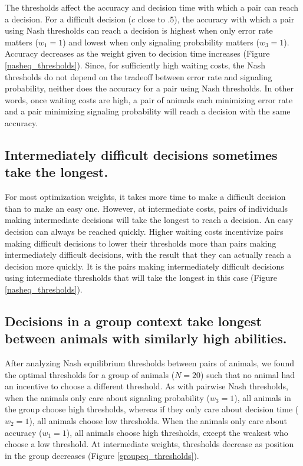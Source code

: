 \documentclass{article}
\begin{document}
The thresholds affect the accuracy and decision time with which a pair can reach a decision.  For a difficult decision ($c$ close to $.5$), the accuracy with which a pair using Nash thresholds can reach a decision is highest when only error rate matters ($w_1=1$) and lowest when only signaling probability matters ($w_3=1$).  Accuracy decreases as the weight given to decision time increases (Figure \ref{nasheq_thresholds}).  Since, for sufficiently high waiting costs, the Nash thresholds do not depend on the tradeoff between error rate and signaling probability, neither does the accuracy for a pair using Nash thresholds.  In other words, once waiting costs are high, a pair of animals each minimizing error rate and a pair minimizing signaling probability will reach a decision with the same accuracy.


\subsection{Intermediately difficult decisions sometimes take the longest. }

For most optimization weights, it takes more time to make a difficult decision than to make an easy one.  However, at intermediate costs, pairs of individuals making intermediate decisions will take the longest to reach a decision.  An easy decision can always be reached quickly.  Higher waiting costs incentivize pairs making difficult decisions to lower their thresholds more than pairs making intermediately difficult decisions, with the result that they can actually reach a decision more quickly.  It is the pairs making intermediately difficult decisions using intermediate thresholds that will take the longest in this case (Figure \ref{nasheq_thresholds}). 


\subsection{Decisions in a group context take longest between animals with similarly high abilities. }

After analyzing Nash equilibrium thresholds between pairs of animals, we found the optimal thresholds for a group of animals ($N=20$) such that no animal had an incentive to choose a different threshold.  As with pairwise Nash thresholds, when the animals only care about signaling probability ($w_3=1$), all animals in the group choose high thresholds, whereas if they only care about decision time ($w_2=1$), all animals choose low thresholds.  When the animals only care about accuracy ($w_1=1$), all animals choose high thresholds, except the weakest who choose a low threshold.  At intermediate weights, thresholds decrease as position in the group decreases (Figure \ref{groupeq_thresholds}).
\end{document}
